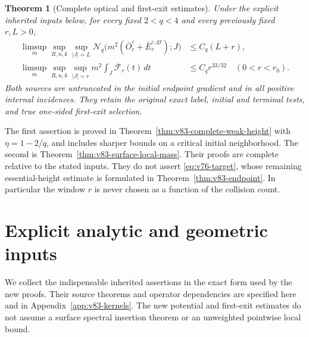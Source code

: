 \documentclass[11pt,reqno]{amsart}
\numberwithin{equation}{section}
\newtheorem{theorem}{Theorem}[section]
\theoremstyle{definition}
\theoremstyle{remark}\newtheorem{remark}[theorem]{Remark}
\begin{document}
\begin{theorem}[Complete optical and first-exit estimates]
\label{thm:v83-main}
Under the explicit inherited inputs below, for every fixed $2<q<4$
and every previously fixed $r,L>0$,
\begin{align}
 \limsup_m\sup_{R,n,k}\sup_{|J|=L}
 \mathcal N_q\bigl(m^2(\bar O_r^\varepsilon+
             \bar E_r^{\varepsilon,\mathrm{gr}});J\bigr)
                                     &\le C_q(L+r),\label{eq:v83-main-optical}\\
 \limsup_m\sup_{R,n,k}\sup_{|J|=r}
           m^2\int_J\overline{\mathcal F}_r(t)\,dt
                                     &\le C_q r^{33/32}
                               \quad(0<r<r_0).\label{eq:v83-main-surface}
\end{align}
Both sources are untruncated in the initial endpoint gradient and in
all positive internal incidences. They retain the original exact label,
initial and terminal tests, and true one-sided first-exit selection.
\end{theorem}
The first assertion is proved in Theorem~\ref{thm:v83-complete-weak-height}
with $\eta=1-2/q$, and includes sharper bounds on a critical initial
neighborhood. The second is Theorem~\ref{thm:v83-surface-local-mass}.
Their proofs are complete relative to the stated inputs. They do not
assert \eqref{eq:v76-target}, whose remaining essential-height estimate
is formulated in Theorem~\ref{thm:v83-endpoint}. In particular the
window $r$ is never chosen as a function of the collision count.

\section{Explicit analytic and geometric inputs}
We collect the indispensable inherited assertions in the exact form
used by the new proofs. Their source theorems and operator dependencies
are specified here and in Appendix~\ref{app:v83-kernels}. The new
potential and first-exit estimates do not assume a surface spectral
insertion theorem or an unweighted pointwise local bound.
\end{document}
